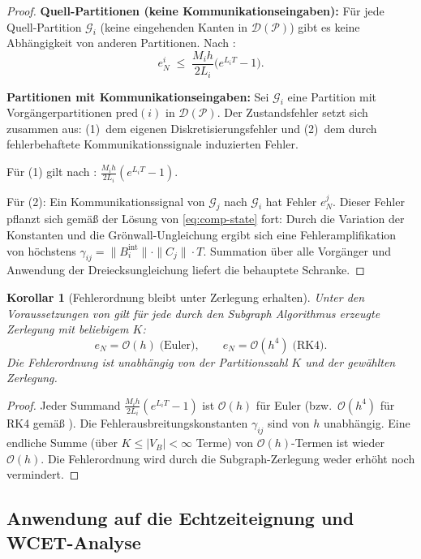 ﻿\documentclass[12pt,a4paper]{article}
\newtheorem{korollar}[theorem]{Korollar}
\theoremstyle{definition}
\begin{document}
\begin{proof}
\textbf{Quell-Partitionen (keine Kommunikationseingaben):}
Für jede Quell-Parti\-tion $\mathcal{G}_i$ (keine eingehenden Kanten in
$\mathcal{D}(\mathcal{P})$) gibt es keine Abhängigkeit von anderen
Partitionen. Nach :
\[
  e_N^i \;\leq\; \frac{M_i h}{2 L_i}\bigl(e^{L_i T} - 1\bigr).
\]

\textbf{Partitionen mit Kommunikationseingaben:}
Sei $\mathcal{G}_i$ eine Partition mit Vorgängerpartitionen
$\mathrm{pred}(i)$ in $\mathcal{D}(\mathcal{P})$. Der Zustandsfehler
setzt sich zusammen aus:
(1)~dem eigenen Diskretisierungsfehler und
(2)~dem durch fehlerbehaftete Kommunikationssignale induzierten Fehler.

Für (1) gilt nach :
$\frac{M_i h}{2L_i}(e^{L_i T} - 1)$.

Für (2): Ein Kommunikationssignal von $\mathcal{G}_j$ nach $\mathcal{G}_i$
hat Fehler $e_N^j$. Dieser Fehler pflanzt sich gemäß der Lösung von
\eqref{eq:comp-state} fort: Durch die Variation der Konstanten und die
Grönwall-Ungleichung ergibt sich eine Fehleramplifikation von höchstens
$\gamma_{ij} = \|B_i^{\mathrm{int}}\| \cdot \|C_j\| \cdot T$.
Summation über alle Vorgänger und Anwendung der Dreiecksungleichung
liefert die behauptete Schranke.
\end{proof}

\begin{korollar}[Fehlerordnung bleibt unter Zerlegung erhalten]
\label{kor:subgraph-error-order}
Unter den Voraussetzungen von  gilt für jede
durch den Subgraph Algorithmus erzeugte Zerlegung mit beliebigem $K$:
\[
  e_N = \mathcal{O}(h)  \;\text{(Euler)},\qquad
  e_N = \mathcal{O}(h^4)\;\text{(RK4)}.
\]
Die Fehlerordnung ist unabhängig von der Partitionszahl $K$ und der
gewählten Zerlegung.
\end{korollar}

\begin{proof}
Jeder Summand $\frac{M_i h}{2L_i}(e^{L_i T}-1)$ ist $\mathcal{O}(h)$
für Euler (bzw.\ $\mathcal{O}(h^4)$ für RK4 gemäß ).
Die Fehlerausbreitungskonstanten $\gamma_{ij}$ sind von $h$ unabhängig.
Eine endliche Summe (über $K \leq |V_B| < \infty$ Terme) von
$\mathcal{O}(h)$-Termen ist wieder $\mathcal{O}(h)$. Die Fehlerordnung
wird durch die Subgraph-Zerlegung weder erhöht noch vermindert.
\end{proof}

\subsection{Anwendung auf die Echtzeiteignung und WCET-Analyse}
\label{subsec:subgraph-wcet}
\end{document}
